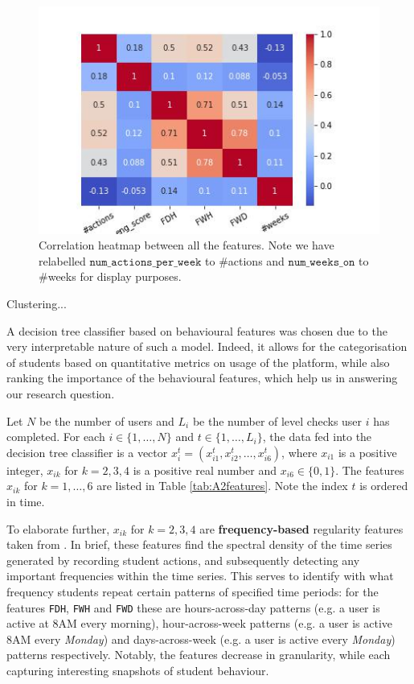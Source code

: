 \documentclass[sigplan,screen]{acmart}
\begin{document}
\begin{figure}
    \centering
    \includegraphics[width=\linewidth]{reports/figures/feature_corr.jpg}
    \caption{Correlation heatmap between all the features. Note we have relabelled $\texttt{num\_actions\_per\_week}$ to \#actions and $\texttt{num\_weeks\_on}$ to \#weeks for display purposes.}
    \label{fig:feature_corr}
\end{figure}


{\color{red}Clustering...}

A decision tree classifier based on behavioural features was chosen due to the very interpretable nature of such a model. Indeed, it allows for the categorisation of students based on quantitative metrics on usage of the platform, while also ranking the importance of the behavioural features, which help us in answering our research question. 

Let $N$ be the number of users and $L_i$ be the number of level checks user $i$ has completed. For each $i \in \{1,\ldots,N\}$ and $t \in \{1, \ldots, L_i\}$, the data fed into the decision tree classifier is a vector $x_i^t = (x_{i1}^t, x_{i2}^t, \ldots, x_{i6}^t)$, where $x_{i1}$ is a positive integer, $x_{ik}$ for $k=2,3,4$ is a positive real number and $x_{i6} \in \{0,1\}$. The features $x_{ik}$ for $k=1,\ldots, 6$ are listed in Table 
\ref{tab:A2features}. Note the index $t$ is ordered in time. 

To elaborate further, $x_{ik}$ for $k=2,3,4$ are \textbf{frequency-based} regularity features taken from \cite{quantifyreg}. In brief, these features find the spectral density of the time series generated by recording student actions, and subsequently detecting any important frequencies within the time series. This serves to identify with what frequency students repeat certain patterns of specified time periods: for the features \texttt{FDH}, \texttt{FWH} and \texttt{FWD} these are hours-across-day patterns (e.g. a user is active at 8AM every morning), hour-across-week patterns (e.g. a user is active 8AM every \textit{Monday}) and days-across-week (e.g. a user is active every \textit{Monday}) patterns respectively. Notably, the features decrease in granularity, while each capturing interesting snapshots of student behaviour. 
\end{document}
